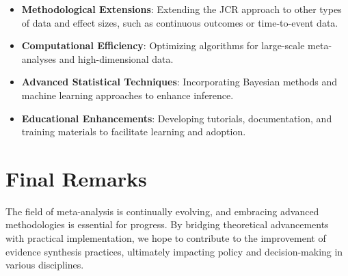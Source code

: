 \documentclass[12pt,a4paper]{report}
\begin{document}
\begin{itemize}
    \item \textbf{Methodological Extensions}: Extending the JCR approach to other types of data and effect sizes, such as continuous outcomes or time-to-event data.
    \item \textbf{Computational Efficiency}: Optimizing algorithms for large-scale meta-analyses and high-dimensional data.
    \item \textbf{Advanced Statistical Techniques}: Incorporating Bayesian methods and machine learning approaches to enhance inference.
    \item \textbf{Educational Enhancements}: Developing tutorials, documentation, and training materials to facilitate learning and adoption.
\end{itemize}

\section{Final Remarks}
\label{sec:final_remarks}

The field of meta-analysis is continually evolving, and embracing advanced methodologies is essential for progress. By bridging theoretical advancements with practical implementation, we hope to contribute to the improvement of evidence synthesis practices, ultimately impacting policy and decision-making in various disciplines.
\end{document}
